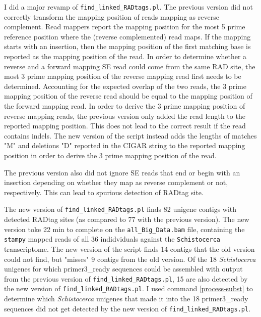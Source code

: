 \documentclass{article}\usepackage[]{graphicx}\usepackage[]{color}
\begin{document}
I did a major revamp of \texttt{find\_linked\_RADtags.pl}. The previous version did not correctly transform the mapping position of reads mapping as reverse complement. Read mappers report the mapping position for the most 5 prime reference position where the (reverse complemented) read maps. If the mapping starts with an insertion, then the mapping position of the first matching base is reported as the mapping position of the read. In order to determine whether a reverse and a forward mapping SE read could come from the same RAD site, the most 3 prime mapping position of the reverse mapping read first needs to be determined. Accounting for the expected overlap of the two reads, the 3 prime mapping position of the reverse read should be equal to the mapping position of the forward mapping read. In order to derive the 3 prime mapping position of reverse mapping reads, the previous version only added the read length to the reported mapping position. This does not lead to the correct result if the read contains indels. The new version of the script instead adds the lengths of matches "M" and deletions "D" reported in the CIGAR string to the reported mapping position in order to derive the 3 prime mapping position of the read.

The previous version also did not ignore SE reads that end or begin with an insertion depending on whether they map as reverse complement or not, respectively. This can lead to spurious detection of RADtag site.   

The new version of \texttt{find\_linked\_RADtags.pl} finds 82 unigene contigs with detected RADtag sites (as compared to 77 with the previous version). The new version toke 22 min to complete on the \texttt{all\_Big\_Data.bam} file, containing the \texttt{stampy} mapped reads of all 36 indidviduals against the \texttt{Schistocerca} transcriptome. The new version of the script finds 14 contigs that the old version could not find, but "misses" 9 contigs from the old version. Of the 18 \textit{Schistocerca} unigenes for which primer3\_ready sequences could be assembled with output from the previous version of \texttt{find\_linked\_RADtags.pl}, 15 are also detected by the new version of \texttt{find\_linked\_RADtags.pl}. I used command \ref{process-subst} to determine which \textit{Schistocerca} unigenes that made it into the 18 primer3\_ready sequences did not get detected by the new version of \texttt{find\_linked\_RADtags.pl}.
\end{document}
